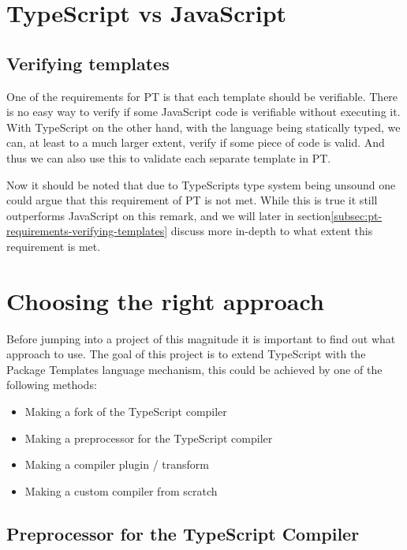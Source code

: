 \section{TypeScript vs JavaScript}\label{sec:typescript-vs-javascript}

\subsection{Verifying templates}\label{subsec:why-typescript-verifying-templates}

One of the requirements for PT is that each template should be verifiable.
There is no easy way to verify if some JavaScript code is verifiable without executing it.
With TypeScript on the other hand, with the language being statically typed, we can, at least to a much larger extent, verify if some piece of code is valid.
And thus we can also use this to validate each separate template in PT.

Now it should be noted that due to TypeScripts type system being unsound one could argue that this requirement of PT is not met.
While this is true it still outperforms JavaScript on this remark, and we will later in section\vref{subsec:pt-requirements-verifying-templates} discuss more in-depth to what extent this requirement is met.



\section{Choosing the right approach}\label{sec:choosing-the-right-approach}

Before jumping into a project of this magnitude it is important to find out what approach to use. 
The goal of this project is to extend TypeScript with the Package Templates language mechanism, this could be achieved by one of the following methods:

\begin{itemize}
    \item Making a fork of the TypeScript compiler
    \item Making a preprocessor for the TypeScript compiler
    \item Making a compiler plugin / transform
    \item Making a custom compiler from scratch
\end{itemize}


\subsection{Preprocessor for the TypeScript Compiler}\label{subsec:preprocessor-for-the-typescript-compiler}

